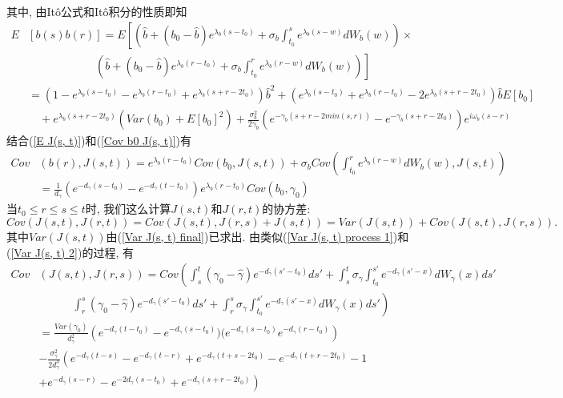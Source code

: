 \documentclass[notitlepage,cs4size,punct,oneside]{ctexrep}
\numberwithin{equation}{section}
\theoremstyle{mystyle}
\begin{document}
其中, 由It\^o公式和It\^o积分的性质即知
\begin{equation}
\begin{split}
E&[b(s)b(r)] = E\left[\left(\hat{b}+(b_0-\hat{b})e^{\lambda_b(s-t_0)}+\sigma_b\int_{t_0}^s e^{\lambda_b(s-w)}dW_b(w)\right)\right.\times \\
&\quad\quad\quad\quad\quad\quad\left.\left(\hat{b}+(b_0-\hat{b})e^{\lambda_b(r-t_0)}+\sigma_b\int_{t_0}^r e^{\lambda_b(r-w)}dW_b(w)\right) \right] \\
&= \left(1-e^{\lambda_b(s-t_0)}-e^{\lambda_b(r-t_0)}+e^{\lambda_b(s+r-2t_0)}\right)\hat{b}^2 + \left(e^{\lambda_b(s-t_0)}+e^{\lambda_b(r-t_0)}-2e^{\lambda_b(s+r-2t_0)}\right)\hat{b}E[b_0] \\
&\quad + e^{\lambda_b(s+r-2t_0)}\left(Var(b_0) + E[b_0]^2\right) + \frac{\sigma_b^2}{2\gamma_b}\left(e^{-\gamma_b(s+r-2min(s, r))}-e^{-\gamma_b(s+r-2t_0)}\right)e^{i\omega_b(s-r)}
\end{split}
\end{equation}
结合(\ref{E J(s, t)})和(\ref{Cov b0 J(s, t)})有
\begin{equation}
\begin{split}
Cov&(b(r), J(s, t)) = e^{\lambda_b(r-t_0)}Cov(b_0, J(s, t)) + \sigma_bCov\left(\int_{t_0}^r e^{\lambda_b(r-w)}dW_b(w), J(s, t)\right) \\
&= \frac{1}{d_\gamma}(e^{-d_\gamma(s-t_0)}-e^{-d_\gamma(t-t_0)})e^{\lambda_b(r-t_0)}Cov(b_0, \gamma_0)
\end{split}
\end{equation}
当$t_0 \leqslant r \leqslant s \leqslant t$时, 我们这么计算$J(s, t)$和$J(r, t)$的协方差:
\begin{equation}
Cov(J(s, t), J(r, t)) = Cov(J(s, t), J(r, s)+J(s, t)) = Var(J(s, t)) + Cov(J(s, t), J(r, s)).
\end{equation}
其中$Var(J(s, t))$由(\ref{Var J(s, t) final})已求出. 由类似(\ref{Var J(s, t) process 1})和(\ref{Var J(s, t) 2})的过程, 有
\begin{equation}
\begin{split}
Cov&(J(s, t), J(r, s)) = Cov\left(\int_s^t(\gamma_0-\hat{\gamma})e^{-d_\gamma(s'-t_0)}ds' +\int_s^t \sigma_\gamma\int_{t_0}^{s'} e^{-d_\gamma(s'-x)}dW_\gamma(x)ds'\right. \\
&\quad\quad\quad\left. \int_r^s(\gamma_0-\hat{\gamma})e^{-d_\gamma(s'-t_0)}ds' +\int_r^s \sigma_\gamma\int_{t_0}^{s'} e^{-d_\gamma(s'-x)}dW_\gamma(x)ds'\right) \\
&= \frac{Var(\gamma_0)}{d_\gamma^2}\left(e^{-d_\gamma(t-t_0)}-e^{-d_\gamma(s-t_0)})(e^{-d_\gamma(s-t_0)}e^{-d_\gamma(r-t_0)}\right)\\
&-\frac{\sigma_\gamma^2}{2d_\gamma^3}\left(e^{-d_\gamma(t-s)}-e^{-d_\gamma(t-r)}+e^{-d_\gamma(t+s-2t_0)}-e^{-d_\gamma(t+r-2t_0)}-1 \right.\\
&\left.+e^{-d_\gamma(s-r)}-e^{-2d_\gamma(s-t_0)}+e^{-d_\gamma(s+r-2t_0)}\right)
\end{split}
\end{equation}
\end{document}
